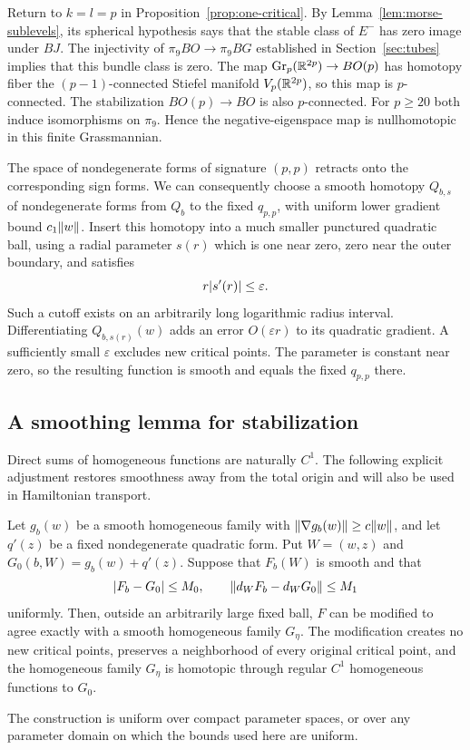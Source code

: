 Return to $k=l=p$ in Proposition~\ref{prop:one-critical}. By Lemma~\ref{lem:morse-sublevels}, its spherical hypothesis says that the stable class of $E^-$ has zero image under $BJ$. The injectivity of $\pi_9BO\to\pi_9BG$ established in Section~\ref{sec:tubes} implies that this bundle class is zero. The map $\operatorname{Gr}_p(\mathbb R^{2p})\to BO(p)$ has homotopy fiber the $(p-1)$-connected Stiefel manifold $V_p(\mathbb R^{2p})$, so this map is $p$-connected. The stabilization $BO(p)\to BO$ is also $p$-connected. For $p\geq20$ both induce isomorphisms on $\pi_9$. Hence the negative-eigenspace map is nullhomotopic in this finite Grassmannian.

The space of nondegenerate forms of signature $(p,p)$ retracts onto the corresponding sign forms. We can consequently choose a smooth homotopy $Q_{b,s}$ of nondegenerate forms from $Q_b$ to the fixed $q_{p,p}$, with uniform lower gradient bound $c_1\lVert w\rVert$. Insert this homotopy into a much smaller punctured quadratic ball, using a radial parameter $s(r)$ which is one near zero, zero near the outer boundary, and satisfies
\[
 r\lvert s'(r)\rvert\leq\varepsilon.
\]
Such a cutoff exists on an arbitrarily long logarithmic radius interval. Differentiating $Q_{b,s(r)}(w)$ adds an error $O(\varepsilon r)$ to its quadratic gradient. A sufficiently small $\varepsilon$ excludes new critical points. The parameter is constant near zero, so the resulting function is smooth and equals the fixed $q_{p,p}$ there.

\subsection{A smoothing lemma for stabilization}

Direct sums of homogeneous functions are naturally $C^1$. The following explicit adjustment restores smoothness away from the total origin and will also be used in Hamiltonian transport.

\begin{lemma}\label{lem:stabilization-smoothing}
Let $g_b(w)$ be a smooth homogeneous family with $\lVert\nabla g_b(w)\rVert\geq c\lVert w\rVert$, and let $q'(z)$ be a fixed nondegenerate quadratic form. Put $W=(w,z)$ and $G_0(b,W)=g_b(w)+q'(z)$. Suppose that $F_b(W)$ is smooth and that
\[
 \lvert F_b-G_0\rvert\leq M_0,\qquad
 \lVert d_WF_b-d_WG_0\rVert\leq M_1
\]
uniformly. Then, outside an arbitrarily large fixed ball, $F$ can be modified to agree exactly with a smooth homogeneous family $G_\eta$. The modification creates no new critical points, preserves a neighborhood of every original critical point, and the homogeneous family $G_\eta$ is homotopic through regular $C^1$ homogeneous functions to $G_0$.

The construction is uniform over compact parameter spaces, or over any parameter domain on which the bounds used here are uniform.
\end{lemma}

